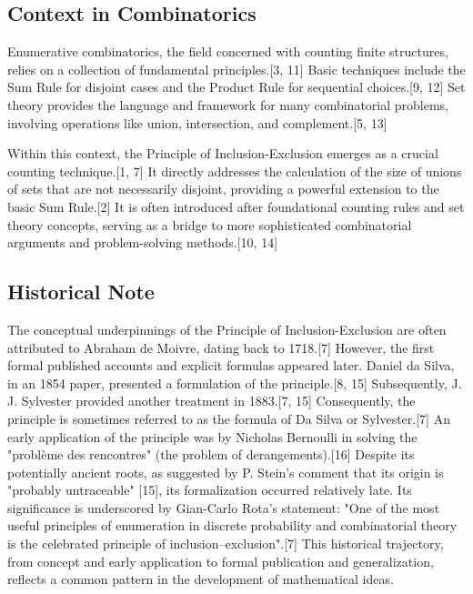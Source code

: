 \documentclass[11pt]{amsart}
\theoremstyle{plain}
\theoremstyle{definition}
\theoremstyle{remark}
\begin{document}
\subsection{Context in Combinatorics}
Enumerative combinatorics, the field concerned with counting finite structures, relies on a collection of fundamental principles.[3, 11] Basic techniques include the Sum Rule for disjoint cases and the Product Rule for sequential choices.[9, 12] Set theory provides the language and framework for many combinatorial problems, involving operations like union, intersection, and complement.[5, 13]

Within this context, the Principle of Inclusion-Exclusion emerges as a crucial counting technique.[1, 7] It directly addresses the calculation of the size of unions of sets that are not necessarily disjoint, providing a powerful extension to the basic Sum Rule.[2] It is often introduced after foundational counting rules and set theory concepts, serving as a bridge to more sophisticated combinatorial arguments and problem-solving methods.[10, 14]

\subsection{Historical Note}
The conceptual underpinnings of the Principle of Inclusion-Exclusion are often attributed to Abraham de Moivre, dating back to 1718.[7] However, the first formal published accounts and explicit formulas appeared later. Daniel da Silva, in an 1854 paper, presented a formulation of the principle.[8, 15] Subsequently, J. J. Sylvester provided another treatment in 1883.[7, 15] Consequently, the principle is sometimes referred to as the formula of Da Silva or Sylvester.[7] An early application of the principle was by Nicholas Bernoulli in solving the "problème des rencontres" (the problem of derangements).[16] Despite its potentially ancient roots, as suggested by P. Stein's comment that its origin is "probably untraceable" [15], its formalization occurred relatively late. Its significance is underscored by Gian-Carlo Rota's statement: "One of the most useful principles of enumeration in discrete probability and combinatorial theory is the celebrated principle of inclusion–exclusion".[7] This historical trajectory, from concept and early application to formal publication and generalization, reflects a common pattern in the development of mathematical ideas.
\end{document}
